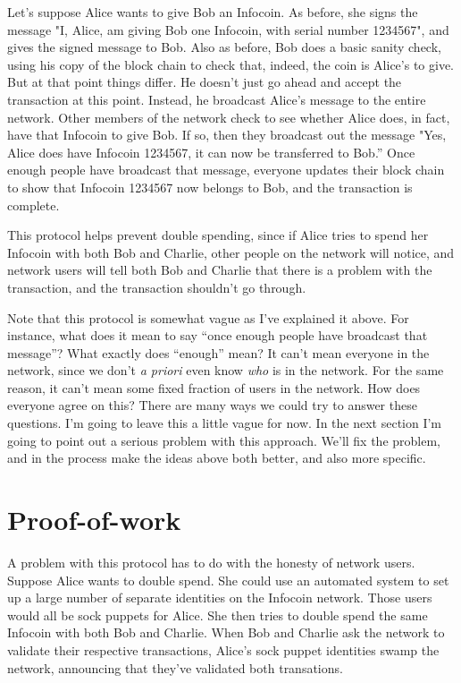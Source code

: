 \documentclass[12pt]{book}
\newcounter{problem}[chapter]
\begin{document}
Let's suppose Alice wants to give Bob an Infocoin.  As before, she
signs the message "I, Alice, am giving Bob one Infocoin, with serial
number 1234567", and gives the signed message to Bob.  Also as before,
Bob does a basic sanity check, using his copy of the block chain to
check that, indeed, the coin is Alice's to give.  But at that point
things differ.  He doesn't just go ahead and accept the transaction at
this point.  Instead, he broadcast Alice's message to the entire
network.  Other members of the network check to see whether Alice
does, in fact, have that Infocoin to give Bob.  If so, then they
broadcast out the message "Yes, Alice does have Infocoin 1234567, it
can now be transferred to Bob.''  Once enough people have broadcast
that message, everyone updates their block chain to show that Infocoin
1234567 now belongs to Bob, and the transaction is complete.

This protocol helps prevent double spending, since if Alice tries to
spend her Infocoin with both Bob and Charlie, other people on the
network will notice, and network users will tell both Bob and Charlie
that there is a problem with the transaction, and the transaction
shouldn't go through.

Note that this protocol is somewhat vague as I've explained it above.
For instance, what does it mean to say ``once enough people have
broadcast that message''?  What exactly does ``enough'' mean?  It
can't mean everyone in the network, since we don't \emph{a priori}
even know \emph{who} is in the network.  For the same reason, it can't
mean some fixed fraction of users in the network.  How does everyone
agree on this?  There are many ways we could try to answer these
questions.  I'm going to leave this a little vague for now.  In the
next section I'm going to point out a serious problem with this
approach.  We'll fix the problem, and in the process make the ideas
above both better, and also more specific.


\section{Proof-of-work}

A problem with this protocol has to do with the honesty of network
users.  Suppose Alice wants to double spend.  She could use an
automated system to set up a large number of separate identities on
the Infocoin network.  Those users would all be sock puppets for
Alice.  She then tries to double spend the same Infocoin with both Bob
and Charlie.  When Bob and Charlie ask the network to validate their
respective transactions, Alice's sock puppet identities swamp the
network, announcing that they've validated both transations.
\end{document}
